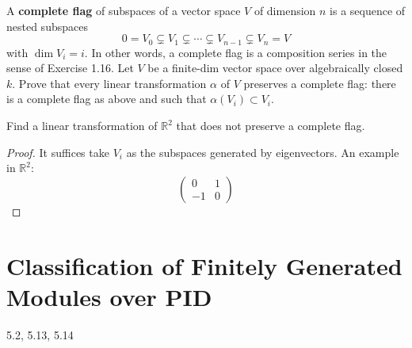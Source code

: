 \documentclass[openany]{book}
\newcommand{\R}{\mathbb{R}}
\begin{document}
\begin{prob}[7.15]
    A \textbf{complete flag} of subspaces of a vector space \( V \) of dimension \( n \) is a sequence of nested subspaces
\[
0 = V_0 \subsetneq V_1 \subsetneq \cdots \subsetneq V_{n-1} \subsetneq V_n = V
\]
with \(\dim V_i = i\). In other words, a complete flag is a composition series in the sense of Exercise 1.16. Let $V$ be a finite-dim vector space over algebraically closed $k$. Prove that every linear transformation $\alpha$ of $V$ preserves a complete flag: there is a complete flag as above and such that $\alpha(V_i)\subset V_i$.

Find a linear transformation of $\R^2$ that does not preserve a complete flag.
\end{prob}

\begin{proof}
    It suffices take $V_i$ as the subspaces generated by eigenvectors.
    An example in $\R^2$:
    \begin{equation*}
        \begin{pmatrix}
            0&1\\
            -1&0
        \end{pmatrix}
    \end{equation*}

\end{proof}


\section{Classification of Finitely Generated Modules over PID}

5.2, 5.13, 5.14







\end{document}
